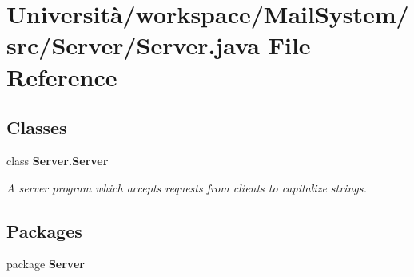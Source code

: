 \section{Università/workspace/\+Mail\+System/src/\+Server/\+Server.java File Reference}
\label{_server_8java}
\subsection*{Classes}
\begin{DoxyCompactItemize}
\item 
class \textbf{ Server.\+Server}
\begin{DoxyCompactList}\small\item\em A server program which accepts requests from clients to capitalize strings. \end{DoxyCompactList}\end{DoxyCompactItemize}
\subsection*{Packages}
\begin{DoxyCompactItemize}
\item 
package \textbf{ Server}
\end{DoxyCompactItemize}

